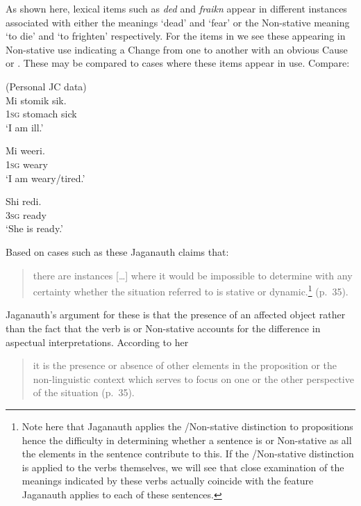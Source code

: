 As shown here, lexical items such as \textit{ded} and \textit{fraikn}
appear in different instances associated with either the 
meanings `dead' and `fear' or the Non-stative meaning `to die' and ‘to
frighten' respectively.  For the items in  we see these
appearing in Non-stative use indicating a Change from one  to
another with an obvious Cause or .  These may be compared to
cases where these items appear in  use.  Compare:

\ea%
\label{ex:2:14}
(Personal JC data)\\
\ea
    \gll Mi stomik sik.\\
\textsc{1sg} stomach sick\\
\glt  `I am ill.'

\ex
  \gll  Mi weeri.\\
\textsc{1sg} weary \\
\glt `I am weary/tired.'

\ex
   \gll Shi redi.\\
\textsc{3sg} ready\\
\glt `She is ready.'\z \z

Based on cases such as these Jaganauth claims that:

\begin{quote}
there are instances […] where it would be impossible to determine with any
certainty whether the situation referred to is stative or
dynamic.\footnote{Note here that Jaganauth applies the
  \slash Non-stative distinction to propositions hence the
  difficulty in determining whether a sentence is  or
  Non-stative as all the elements in the sentence contribute to
  this. If the \slash Non-stative distinction is applied to the verbs
  themselves, we will see that close examination of the meanings
  indicated by these verbs actually coincide with the feature
  Jaganauth applies to each of these sentences.}  (p.~35).
\end{quote}

Jaganauth’s argument for these is that the presence of an affected
object rather than the fact that the verb is  or Non-stative
accounts for the difference in aspectual interpretations.  According
to her

\begin{quote}
it is the presence or absence of other elements in the proposition or
the non-linguistic context which serves to focus on one or the other
perspective of the situation (p.~35).
\end{quote}

